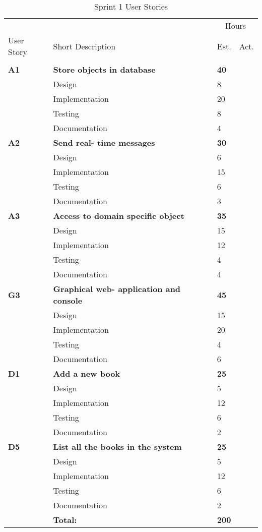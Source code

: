 \begin{table}
\caption{Sprint 1 User Stories}
\centering
\begin{tabular}{ l p{8cm} l l }
\hline 
			&				&\multicolumn{2}{c}{Hours}			\\
 User Story	& Short Description		&Est.		&Act.	                               \\ 
\hline \\ [-2.0ex]
 \bf{A1}     &\bf{Store objects in database}		&\bf{40}		&                                               \\ 
		  &Design							&8			&		\\
		  &Implementation					&20			&		\\
		  &Testing						&8			&		\\
		  &Documentation					&4			&		\\

 \bf{A2}     &\bf{Send real- time messages} 		&\bf{30}		&                  \\ 
		  &Design							&6			&		\\
		  &Implementation					&15			&		\\
		  &Testing						&6			&		\\
		  &Documentation					&3			&		\\

 \bf{A3}     &\bf{Access to domain specific object} 		&\bf{35}		&		     \\ 
		  &Design							&15			&		\\
		  &Implementation					&12			&		\\
		  &Testing						&4		&		\\
		  &Documentation					&4			&		\\

 \bf{G3}     &\bf{Graphical web- application and console}		&\bf{45}		&		     \\ 
		  &Design							&15			&		\\
		  &Implementation					&20			&		\\
		  &Testing						&4			&		\\
		  &Documentation					&6			&		\\

 \bf{D1}	   &\bf{Add a new book}		&\bf{25}		&		     \\
		  &Design							&5			&		\\
		  &Implementation					&12			&		\\
		  &Testing						&6			&		\\
		  &Documentation					&2			&		\\

 \bf{D5}	   &\bf{List all the books in the system}		&\bf{25}		&		     \\
		  &Design							&5			&		\\
		  &Implementation					&12			&		\\
		  &Testing						&6			&		\\
		  &Documentation					&2			&		\\
\hline 
		  &\bf{Total:}			&\bf{200}		&		\\
\hline
\end{tabular}
\label{table:sp1usrstories}
\end{table}


